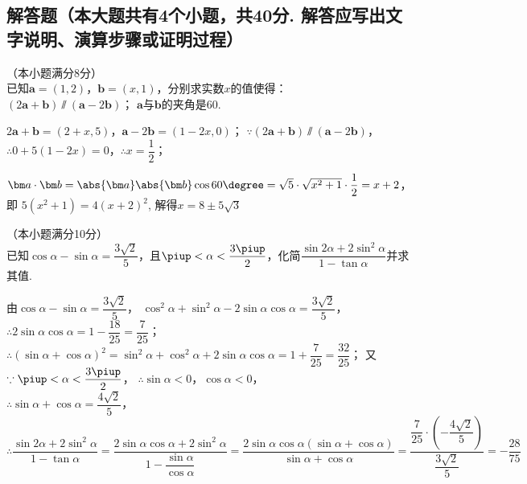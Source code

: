 \begin{exercise}
\section{解答题（本大题共有4个小题，共40分. 解答应写出文字说明、演算步骤或证明过程）}
  \item
    （本小题满分8分）\\
    已知$\bm a=(1,2)$，$\bm b=(x,1)$，分别求实数$x$的值使得：\\
     $(2\bm a+\bm b)\varparallel(\bm a-2\bm b)$；
     $\bm a$与$\bm b$的夹角是60\degree.
    \begin{answer}
       $2\bm a+\bm b=(2+x,5)$，$\bm a-2\bm b=(1-2x,0)$；
        $\because (2\bm a+\bm b)\varparallel(\bm a-2\bm b)$，
        $\therefore 0+5(1-2x)=0$，$\therefore x=\dfrac12$；\par
       $\bm a\cdot\bm b
        =\abs{\bm a}\abs{\bm b}\cos{60\degree}
        =\sqrt5\cdot\sqrt{x^2+1}\cdot\dfrac12=x+2$，即
        $5(x^2+1)=4(x+2)^2$,
        解得$x=8\pm 5\sqrt3$
    \end{answer}
  \vspace{4em}
  \item
    （本小题满分10分）\\
    已知$\cos\alpha-\sin\alpha=\dfrac{3\sqrt2}5$，且$\piup<\alpha<\dfrac{3\piup}2$，化简$\dfrac{\sin{2\alpha}+2\sin^2\alpha}{1-\tan\alpha}$并求其值.
    \begin{answer}
      由$\cos\alpha-\sin\alpha=\dfrac{3\sqrt2}5$，
      $\cos^2\alpha+\sin^2\alpha-2\sin\alpha\cos\alpha=\dfrac{3\sqrt2}{5}$，\\
      $\therefore 2\sin\alpha\cos\alpha=1-\dfrac{18}{25}=\dfrac7{25}$；\\
      $\therefore (\sin\alpha+\cos\alpha)^2=\sin^2\alpha+\cos^2\alpha+2\sin\alpha\cos\alpha
      =1+\dfrac7{25}=\dfrac{32}{25}$；
      又$\because \piup<\alpha<\dfrac{3\piup}2$，
      $\therefore \sin\alpha<0$，$\cos\alpha<0$，\\
      $\therefore \sin\alpha+\cos\alpha=\dfrac{4\sqrt2}5$，\\
      $\therefore \dfrac{\sin{2\alpha}+2\sin^2\alpha}{1-\tan\alpha}
      =\dfrac{2\sin\alpha\cos\alpha+2\sin^2\alpha}{1-\dfrac{\sin\alpha}{\cos\alpha}}
      =\dfrac{2\sin\alpha\cos\alpha(\sin\alpha+\cos\alpha)}{\sin\alpha+\cos\alpha}
      =\dfrac{\dfrac7{25}\cdot(-\dfrac{4\sqrt2}{5})}{\dfrac{3\sqrt2}{5}}
      =-\dfrac{28}{75}$
    \end{answer}
  \vspace{4em}
  \item

\end{exercise}
